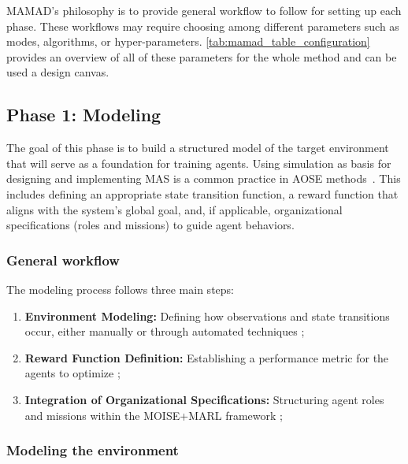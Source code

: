 \documentclass[pdflatex,sn-mathphys-num]{sn-jnl}%
\theoremstyle{thmstyleone}%
\theoremstyle{thmstyletwo}%
\theoremstyle{thmstylethree}%
\begin{document}
MAMAD's philosophy is to provide general workflow to follow for setting up each phase. These workflows may require choosing among different parameters such as modes, algorithms, or hyper-parameters. \autoref{tab:mamad_table_configuration} provides an overview of all of these parameters for the whole method and can be used a design canvas.



\subsection{Phase 1: Modeling}\label{sec:modelling}

The goal of this phase is to build a structured model of the target environment that will serve as a foundation for training agents. Using simulation as basis for designing and implementing MAS is a common practice in AOSE methods~\cite{Jamont2O15}. This includes defining an appropriate state transition function, a reward function that aligns with the system's global goal, and, if applicable, organizational specifications (roles and missions) to guide agent behaviors.

\subsubsection{{General workflow}}
The modeling process follows three main steps:
\begin{enumerate}
    \item \textbf{Environment Modeling:} Defining how observations and state transitions occur, either manually or through automated techniques ;
    \item \textbf{Reward Function Definition:} Establishing a performance metric for the agents to optimize ;
    \item \textbf{Integration of Organizational Specifications:} Structuring agent roles and missions within the MOISE+MARL framework ;
\end{enumerate}

\subsubsection{Modeling the environment}
\end{document}
